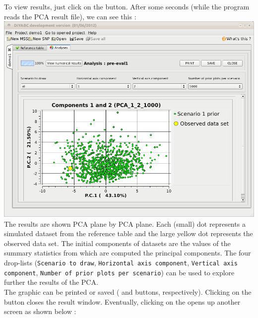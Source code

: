 To view results, just click on the  button. After some seconds (while the program reads the PCA result file), we can see this : \\

\includegraphics[scale=0.35]{gui_pictures/Capture-DIYABC-32.png} \\

The results are shown PCA plane by PCA plane. Each (small) dot represents a simulated dataset from the reference table and the large yellow dot represents the observed data set. The initial components of datasets are the values of the summary statistics from which are computed the principal components. The four drop-lists (\texttt{Scenario to draw}, \texttt{Horizontal axis component}, \texttt{Vertical axis component}, \texttt{Number of prior plots per scenario}) can be used to explore further the results of the PCA.\\
The graphic can be printed or saved ( and  buttons, respectively). Clicking on the  button closes the result window. Eventually, clicking on the  opens up another screen as shown below :\\

